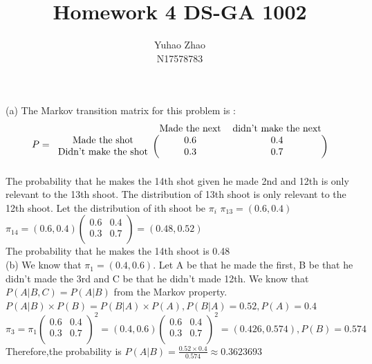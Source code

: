 \documentclass[11pt]{article}
\newenvironment{problem}[2][Problem]{\begin{trivlist}
\item[\hskip \labelsep {\bfseries #1}\hskip \labelsep {\bfseries #2.}]}{\end{trivlist}}
\begin{document}
 
 
\title{Homework 4 DS-GA 1002 }%
\author{Yuhao Zhao\\ %
N17578783} %
 
\maketitle
\begin{problem}{1}
\end{problem}
(a) The Markov transition matrix for  this problem is  :
\[P = 
    \begin{blockarray}{ccc}
     &\text{Made the next} & \text{didn't make the next}\\
    \begin{block}{c(cc)}
    \text{Made the shot} & 0.6  &0.4 \\
    \text{Didn't make the shot}  & 0.3 &0.7 \\
    \end{block}
    \end{blockarray}
\]
The probability that he makes the 14th shot given he made 2nd and 12th is only relevant to the 13th shoot. The distribution of 13th shoot is only relevant to the 12th shoot. Let the distribution of ith shoot be $\pi_i$
$\pi_{13} = (0.6,0.4)$\\
$\pi_{14} = (0.6,0.4)  \left( \begin{array}{cc}
0.6 &0.4 \\
0.3& 0.7\\
\end{array} \right) = (0.48,0.52)$ \\
The probability that he makes the 14th shoot is 0.48\\

(b) We know that $\pi_{1} = (0.4,0.6)$. Let A be that  he made the first, B be that he didn't made the 3rd and C be that he didn't made 12th. We know that $P(A|B,C) = P(A|B)$ from the Markov property.\\
$P(A|B) \times P(B) = P(B|A) \times P(A), P(B|A) = 0.52,P(A) = 0.4$\\
$\pi_3= \pi_{1}  \left( \begin{array}{cc}
0.6 &0.4 \\
0.3& 0.7\\
\end{array} \right)^2 = (0.4,0.6)  \left( \begin{array}{cc}
0.6 &0.4 \\
0.3& 0.7\\
\end{array} \right)^2 = (0.426 ,0.574), P(B) = 0.574$\\
Therefore,the probability is $P(A|B) = \frac{0.52 \times 0.4}{0.574} \approx 0.3623693$\\
\end{document}
